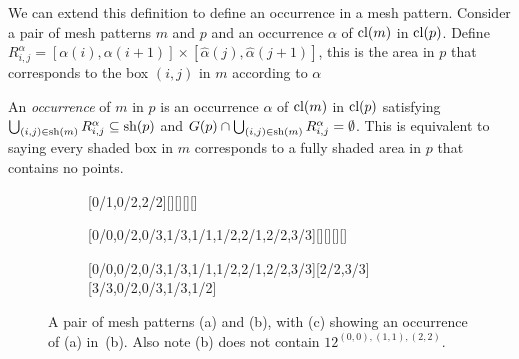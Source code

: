 \documentclass[11pt,a4paper,oneside]{article}
\begin{document}
We can extend this definition to define an occurrence in a mesh pattern.
Consider a pair of mesh patterns $m$ and $p$ and an occurrence $\alpha$ of
$\operatorname{\textrm{cl}}(m)$ in $\operatorname{\textrm{cl}}(p)$. Define
$R^\alpha_{i,j}=[\alpha(i),\alpha(i+1)]\times[\hat{\alpha}(j),\hat{\alpha}(j+1)]$,
this is the area in $p$ that corresponds to the box $(i,j)$ in $m$ according to
$\alpha$

An \emph{occurrence} of $m$ in $p$ is an occurrence $\alpha$ of $\operatorname{\textrm{cl}}(m)$ in
$\operatorname{\textrm{cl}}(p)$ satisfying $\bigcup_{(i,j)\in \operatorname{\textrm{sh}}(m)}R^\alpha_{i,j}\subseteq\operatorname{\textrm{sh}}(p)$ and
$G(p)\cap\bigcup_{(i,j)\in \operatorname{\textrm{sh}}(m)}R^\alpha_{i,j}=\emptyset$. This is equivalent
to saying every shaded box in $m$ corresponds to a fully shaded area in $p$
that contains no points.

\begin{figure}\centering
\begin{subfigure}[b]{0.3\textwidth}
\centering{}[0/1,0/2,2/2][][][][]
\caption{}\label{subfiga}\end{subfigure}
\begin{subfigure}[b]{0.3\textwidth}
\centering{}[0/0,0/2,0/3,1/3,1/1,1/2,2/1,2/2,3/3][][][][]
\caption{}\label{subfigb}\end{subfigure}
\begin{subfigure}[b]{0.3\textwidth}\centering
{}[0/0,0/2,0/3,1/3,1/1,1/2,2/1,2/2,3/3][2/2,3/3][3/3,0/2,0/3,1/3,1/2]
\caption{}\label{subfigc}\end{subfigure}
\caption{A pair of mesh patterns (a) and (b), with (c) showing an occurrence of (a) in~(b).
 Also note (b) does not contain $12^{(0,0),(1,1),(2,2)}$.}\label{fig:occEx}
\end{figure}
\end{document}
